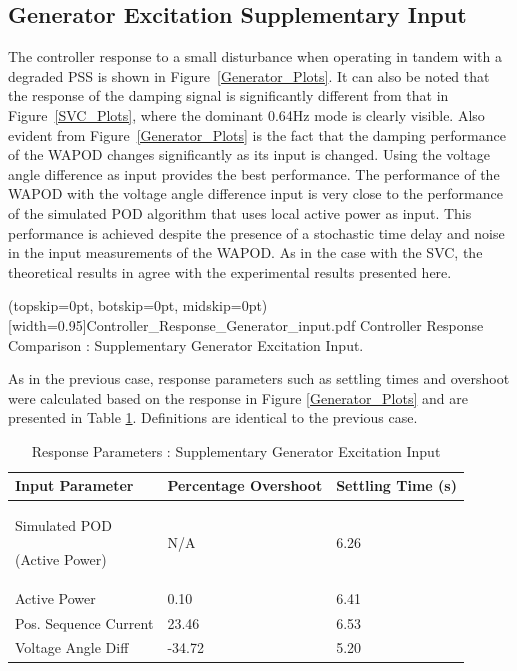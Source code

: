 \documentclass{ieeeaccess}
\begin{document}
\subsection{Generator Excitation Supplementary Input}
The controller response to a small disturbance when operating in tandem with a degraded PSS is shown in Figure~\ref{Generator_Plots}. It can also be noted that the response of the damping signal is significantly different from that in Figure~\ref{SVC_Plots}, where the dominant 0.64Hz mode is clearly visible. Also evident from Figure~\ref{Generator_Plots} is the fact that the damping performance of the WAPOD changes significantly as its input is changed. Using the voltage angle difference as input provides the best performance. The performance of the WAPOD with the voltage angle difference input is very close to the performance of the simulated POD algorithm that uses local active power as input. This performance is achieved despite the presence of a stochastic time delay and noise in the input measurements of the WAPOD. As in the case with the SVC, the theoretical results in \cite{Yuwa} agree with the experimental results presented here.

\Figure[tbp!](topskip=0pt, botskip=0pt, midskip=0pt)[width=0.95\columnwidth]{Controller_Response_Generator_input.pdf}
{Controller Response Comparison : Supplementary Generator Excitation Input.\label{Generator_Plots}}

As in the previous case, response parameters such as settling times and overshoot were calculated based on the response in Figure \ref{Generator_Plots} and are presented in Table \ref{GENResponseTable}. Definitions are identical to the previous case.

\begin{table}[!ht]
\caption{Response Parameters : Supplementary Generator Excitation Input}\label{GENResponseTable}
\begin{center}
\begin{tabular}{|p{80pt}|p{60pt}|p{60pt}|}
\hline \textbf{Input Parameter} & \textbf{Percentage Overshoot} & \textbf{Settling Time (s)} \\
\hline Simulated POD \par (Active Power) & N/A & 6.26\\ 
\hline Active Power & 0.10 & 6.41\\ 
\hline Pos. Sequence Current & 23.46 & 6.53 \\ 
\hline Voltage Angle Diff & -34.72 & 5.20 \\ 
\hline 
\end{tabular}
\end{center}
\end{table}
\end{document}
